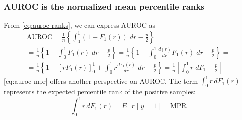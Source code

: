 

\subsubsection{AUROC is the normalized mean percentile ranks}
\label{sec:auroc mpr}

From \autoref{eq:auroc ranks}, we can express AUROC as
%
\begin{multline}
    \text{AUROC}
        = \frac{1}{n} \left\{
            \int_{0}^{1} (1 - F_1(r)) \;dr - \frac{p}{2}
        \right\}
    =\\
        = \frac{1}{n} \left\{
            1 - \int_{0}^{1} F_1(r) \;dr - \frac{p}{2}
        \right\}
        = \frac{1}{n} \left\{
            1 - \int_{0}^{1} \frac{d(r)}{dr}F_1(r) \;dr - \frac{p}{2}
        \right\}
    =\\
        = \frac{1}{n} \left\{
            1 - \left[rF_1(r)\right]_0^1 + \int_{0}^{1} r \frac{d F_1(r)}{dr} \;dr - \frac{p}{2}
        \right\}
        = \frac{1}{n} \left[
            \int_{0}^{1} r \;d F_1 - \frac{p}{2}
        \right]
    \label{eq:auroc mpr}
\end{multline}
%
\autoref{eq:auroc mpr} offers another perspective on AUROC. The term $\int_{0}^{1} r\,d F_1(r)$ represents the expected percentile rank of the positive samples:
%
\begin{equation}
    \int_{0}^{1} r\,d F_1(r) = E[r \mid y = 1] = \text{MPR}
    \label{eq:mpr}    
\end{equation}
%
%
